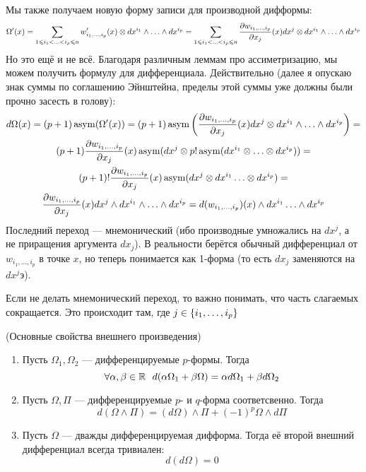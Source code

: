 \begin{note}
	Мы также получаем новую форму записи для производной дифформы:
	\[
		\Omega'(x) = \sum_{1 \leqslant i_1 < \ldots < i_p \leqslant n} w'_{i_1, \ldots, i_p}(x) \otimes dx^{i_1} \wedge \ldots \wedge dx^{i_p} = \sum_{1 \leqslant i_1 < \ldots < i_p \leqslant n} \frac{\partial w_{i_1, \ldots, i_p}}{\partial x_j}(x) dx^j \otimes dx^{i_1} \wedge \ldots \wedge dx^{i_p}
	\]
	Но это ещё и не всё. Благодаря различным леммам про ассиметризацию, мы можем получить формулу для дифференциала. Действительно (далее я опускаю знак суммы по соглашению Эйнштейна, пределы этой суммы уже должны были прочно засесть в голову):
	\begin{multline*}
		d\Omega(x) = (p + 1)\operatorname{asym}(\Omega'(x)) = (p + 1) \operatorname{asym}\left(\frac{\partial w_{i_1, \ldots, i_p}}{\partial x_j}(x)dx^j \otimes dx^{i_1} \wedge \ldots \wedge dx^{i_p}\right) =
		\\
		(p + 1) \frac{\partial w_{i_1, \ldots, i_p}}{\partial x_j}(x) \operatorname{asym}(dx^j \otimes p!\operatorname{asym}(dx^{i_1} \otimes \ldots \otimes dx^{i_p})) =
		\\
		(p + 1)! \frac{\partial w_{i_1, \ldots, i_p}}{\partial x_j}(x) \operatorname{asym}(dx^{j} \otimes dx^{i_1} \ldots \otimes dx^{i_p}) =
		\\
		\frac{\partial w_{i_1, \ldots, i_p}}{\partial x_j}(x) dx^j \wedge dx^{i_1} \wedge \ldots \wedge dx^{i_p} = d(w_{i_1, \ldots, i_p})(x) \wedge dx^{i_1} \ldots \wedge dx^{i_p}
	\end{multline*}
	Последний переход --- мнемонический (ибо производные умножались на $dx^j$, а не приращения аргумента $dx_j$). В реальности берётся обычный дифференциал от $w_{i_1, \ldots, i_p}$ в точке $x$, но теперь понимается как 1-форма (то есть $dx_j$ заменяются на $dx^jэ$).
\end{note}

\begin{note}
	Если не делать мнемонический переход, то важно понимать, что часть слагаемых сокращается. Это происходит там, где $j \in \{i_1, \ldots, i_p\}$
\end{note}

\begin{theorem} (Основные свойства внешнего произведения)
	\begin{enumerate}
		\item Пусть $\Omega_1, \Omega_2$ --- дифференцируемые $p$-формы. Тогда
		\[
			\forall \alpha, \beta \in \R\ \ d(\alpha\Omega_1 + \beta\Omega) = \alpha d\Omega_1 + \beta d\Omega_2
		\]
		
		\item Пусть $\Omega, \Pi$ --- дифференцируемые $p$- и $q$-форма соответсвенно. Тогда
		\[
			d(\Omega \wedge \Pi) = (d\Omega) \wedge \Pi + (-1)^p \Omega \wedge d\Pi
		\]
		
		\item Пусть $\Omega$ --- дважды дифференцируемая дифформа. Тогда её второй внешний дифференциал всегда тривиален:
		\[
			d(d\Omega) = 0
		\]
	\end{enumerate}
\end{theorem}

